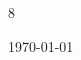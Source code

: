 \documentclass[12pt, a4paper]{article}
\begin{document}


8%

\vspace{-6mm}
\begin{center}
{\scriptsize\today\- }
\end{center}
\end{document}
